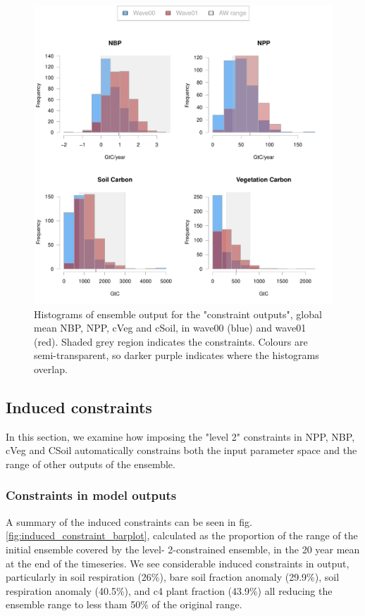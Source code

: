 \documentclass[gmd, manuscript]{copernicus}
\begin{document}
\begin{figure}[t]
\includegraphics[width=12cm]{./figs/fig05.pdf}
\caption{Histograms of ensemble output for the "constraint outputs", global mean NBP, NPP, cVeg and cSoil, in wave00 (blue) and wave01 (red). Shaded grey region indicates the constraints. Colours are semi-transparent, so darker purple indicates where the histograms overlap.}
\label{fig:level_2_constraints_hists}
\end{figure}
 
\subsection{Induced constraints}\label{ssec:induced_constraints}

In this section, we examine how imposing the "level 2" constraints in NPP, NBP, cVeg and CSoil automatically constrains both the input parameter space and the range of other outputs of the ensemble. 

\subsubsection{Constraints in model outputs}\label{sssec:output_constraints}

A summary of the induced constraints can be seen in fig. \ref{fig:induced_constraint_barplot}, calculated as the proportion of the range of the initial ensemble covered by the level- 2-constrained ensemble, in the 20 year mean at the end of the timeseries. We see considerable induced constraints in output, particularly in soil respiration (26\%), bare soil fraction anomaly (29.9\%), soil respiration anomaly (40.5\%), and c4 plant fraction (43.9\%) all reducing the ensemble range to less tham 50\% of the original range.  
\end{document}
